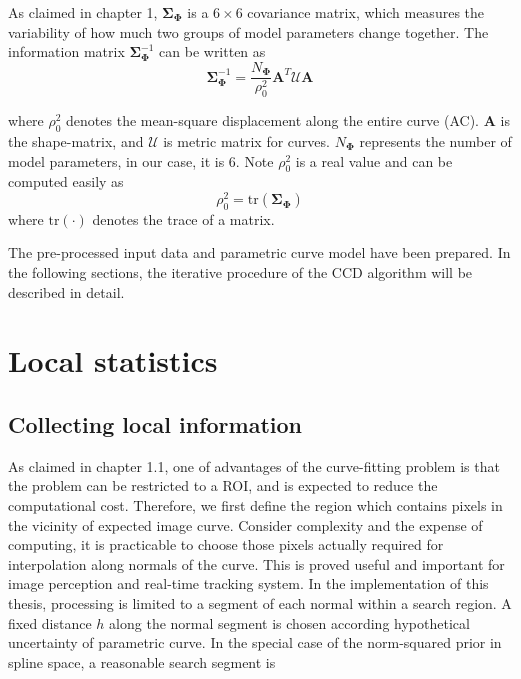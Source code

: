 As claimed in chapter 1, $\mathbf{\Sigma}_{\mathbf{\Phi}}$ is a $6 \times 6$ 
covariance matrix, which measures the variability of
how much two groups of model parameters change together. The
information matrix $\mathbf{\Sigma}_{\mathbf{\Phi}}^{-1}$ can be
written as 
\begin{equation}
  \label{eq:infomatrix}
  \mathbf{\Sigma}_{\mathbf{\Phi}}^{-1} = \frac{N_{\mathbf{\Phi}}}{\rho_0^2} \mathbf{A}^T\mathcal{U}\mathbf{A}
\end{equation}

where $\rho_0^2$ denotes the mean-square displacement along the entire
curve (AC). $\mathbf{A}$ is the shape-matrix, and $\mathcal{U}$ is
metric matrix for curves. $N_{\mathbf{\Phi}}$ represents
the number of model parameters, in our case, it is 6. Note $\rho_0^2$
is a real value and can be computed easily as 
\begin{equation}
  \label{eq:trace}
  \rho_0^2 = \mathrm{tr}(\mathbf{\Sigma}_{\mathbf{\Phi}})
\end{equation}
where $\mathrm{tr}(\cdot)$ denotes the trace of a matrix.

The pre-processed input data and parametric curve model have been
prepared. In the following sections, the iterative procedure of the
CCD algorithm will be described in detail.

\section{Local statistics}
\label{sec:ls}

\subsection{Collecting local information}
\label{sec:cls}


As claimed in chapter 1.1, one of advantages of the curve-fitting
problem is that the problem can be restricted to a ROI, and is
expected to reduce the computational cost. Therefore, we first define
the region which contains pixels in the vicinity of expected image
curve. 
Consider complexity and the expense of computing, it is practicable
to choose those pixels actually required for interpolation along
normals of the curve. This is proved useful and important for image
perception and real-time tracking system. In the implementation of
this thesis, processing is limited to a segment of each normal within
a search region. A fixed distance $h$ along the normal segment is
chosen according hypothetical uncertainty of parametric curve. In the
special case of the norm-squared prior in spline space, a reasonable
search segment is 

